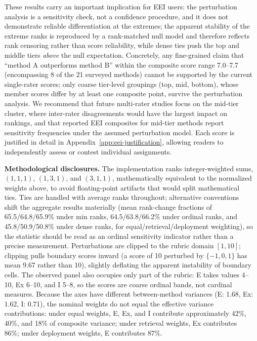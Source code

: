 \documentclass[10pt,twocolumn]{article}
\begin{document}
These results carry an important implication for EEI users: the perturbation analysis is a sensitivity check, not a confidence procedure, and it does not demonstrate reliable differentiation at the extremes; the apparent stability of the extreme ranks is reproduced by a rank-matched null model and therefore reflects rank censoring rather than score reliability, while dense ties push the top and middle tiers \emph{above} the null expectation. Concretely, any fine-grained claim that ``method A outperforms method B'' within the composite score range 7.0--7.7 (encompassing 8 of the 21 surveyed methods) cannot be supported by the current single-rater scores; only coarse tier-level groupings (top, mid, bottom), whose member scores differ by at least one composite point, survive the perturbation analysis. We recommend that future multi-rater studies focus on the mid-tier cluster, where inter-rater disagreements would have the largest impact on rankings, and that reported EEI composites for mid-tier methods report sensitivity frequencies under the assumed perturbation model. Each score is justified in detail in Appendix~\ref{app:eei-justification}, allowing readers to independently assess or contest individual assignments.

\textbf{Methodological disclosures.} The implementation ranks integer-weighted sums, $(1,1,1)$, $(1,3,1)$, and $(3,1,1)$, mathematically equivalent to the normalized weights above, to avoid floating-point artifacts that would split mathematical ties. Ties are handled with average ranks throughout; alternative conventions shift the aggregate results materially (mean rank-change fractions of 65.5/64.8/65.9\% under min ranks, 64.5/63.8/66.2\% under ordinal ranks, and 45.8/50.9/50.8\% under dense ranks, for equal/retrieval/deployment weighting), so the statistic should be read as an ordinal sensitivity indicator rather than a precise measurement. Perturbations are clipped to the rubric domain $[1,10]$; clipping pulls boundary scores inward (a score of 10 perturbed by $\{-1,0,1\}$ has mean 9.67 rather than 10), slightly deflating the apparent instability of boundary cells. The observed panel also occupies only part of the rubric: E takes values 4--10, Ex 6--10, and I 5--8, so the scores are coarse ordinal bands, not cardinal measures. Because the axes have different between-method variances (E: 1.68, Ex: 1.62, I: 0.71), the nominal weights do not equal the effective variance contributions: under equal weights, E, Ex, and I contribute approximately 42\%, 40\%, and 18\% of composite variance; under retrieval weights, Ex contributes 86\%; under deployment weights, E contributes 87\%.
\end{document}
